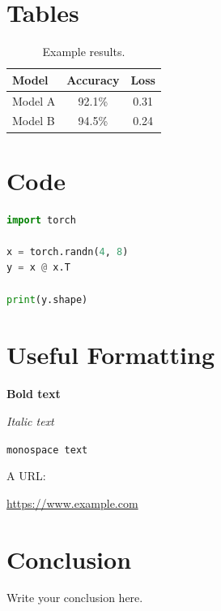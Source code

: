 \documentclass[11pt]{article}
\begin{document}

\section{Tables}

\begin{table}[ht]
    \centering
    \begin{tabular}{lcc}
        \toprule
        Model & Accuracy & Loss \\
        \midrule
        Model A & 92.1\% & 0.31 \\
        Model B & 94.5\% & 0.24 \\
        \bottomrule
    \end{tabular}
    \caption{Example results.}
    \label{tab:results}
\end{table}

\section{Code}

\begin{lstlisting}[language=Python]
import torch

x = torch.randn(4, 8)
y = x @ x.T

print(y.shape)
\end{lstlisting}

\section{Useful Formatting}

\textbf{Bold text}

\textit{Italic text}

\texttt{monospace text}

A URL:

\url{https://www.example.com}

\section{Conclusion}

Write your conclusion here.
\end{document}
